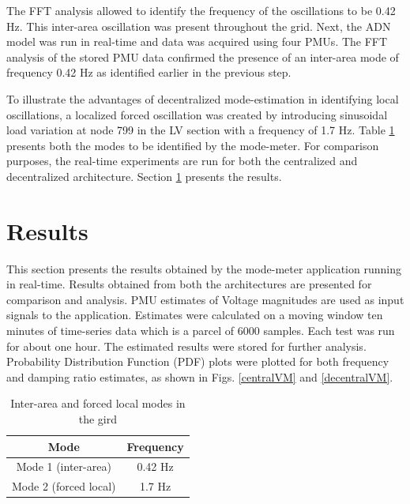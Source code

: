 \documentclass[conference]{IEEEtran}
\begin{document}
The FFT analysis allowed to identify the frequency of the oscillations to be 0.42 Hz. This inter-area oscillation was present throughout the grid. Next, the ADN model was run in real-time and data was acquired using four PMUs. The FFT analysis of the stored PMU data confirmed the presence of an inter-area mode of frequency 0.42 Hz as identified earlier in the previous step. 

To illustrate the advantages of decentralized mode-estimation in identifying local oscillations,  a localized forced oscillation was created by introducing sinusoidal load variation at node 799 in the LV section with a frequency of 1.7 Hz. Table \ref{tab:modes} presents both the modes to be identified by the mode-meter. For comparison purposes, the real-time experiments are run for both the centralized and decentralized architecture. Section \ref{results} presents the results.



\section{Results} \label{results}
This section presents the results obtained by the mode-meter application running in real-time. Results obtained from both the architectures are presented for comparison and analysis. PMU estimates of Voltage magnitudes are used as input signals to the application. Estimates were calculated on a moving window ten minutes of time-series data which is a parcel of 6000 samples. Each test was run for about one hour. The estimated results were stored for further analysis. Probability Distribution Function (PDF) plots were plotted for both frequency and damping ratio estimates, as shown in Figs. \ref{centralVM} and \ref{decentralVM}.
\begin{table}
\caption{Inter-area and forced local modes in the gird}
\vspace{-1em}
\label{tab:modes}
\begin{center}
\begin{tabular}{ |c|c|} 
 \hline
 Mode & Frequency\\ 
 \hline
 Mode 1 (inter-area) & 0.42 Hz\\ 
 \hline
 Mode 2 (forced local) & 1.7 Hz\\ 
 \hline
\end{tabular}
\end{center}
\end{table}
\end{document}
